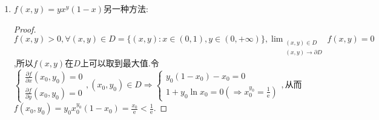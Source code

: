 \documentclass[UTF8]{ctexart}
\newcommand{\e}{\mathrm{e}}
\newcommand{\p}[2]{\frac{\partial #1}{\partial #2}}
\begin{document}
    \begin{enumerate}[13.]
        \item $f(x,y)=yx^y(1-x)$另一种方法:\begin{proof}
            $f(x,y)>0,\forall(x,y)\in D=\{(x,y):x\in(0,1),y\in(0,+\infty)\},\lim_{\substack{(x,y)\in D\\ (x,y)\to\partial D}}f(x,y)=0$,所以$f(x,y)$在$D$上可以取到最大值.令$\begin{cases}
                \p{f}{x}(x_0,y_0)=0\\
                \p{f}{y}(x_0,y_0)=0
            \end{cases},(x_0,y_0)\in D\Rightarrow\begin{cases}
                y_0(1-x_0)-x_0=0\\
                1+y_0\ln x_0=0(\Rightarrow x_0^{y_0}=\frac{1}{\e})
            \end{cases},$从而$f(x_0,y_0)=y_0x_0^{y_0}(1-x_0)=\frac{x_0}{\e}<\frac{1}{\e}$.
        \end{proof}
    \end{enumerate}
\end{document}

